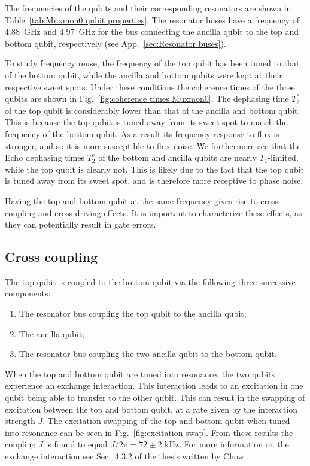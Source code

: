       The frequencies of the qubits and their corresponding resonators are shown in Table~\ref{tab:Muxmon0 qubit properties}. The resonator buses have a frequency of \SI{4.88}{\giga \hertz} and \SI{4.97}{\giga \hertz} for the bus connecting the ancilla qubit to the top and bottom qubit, respectively (see App.~\ref{sec:Resonator buses}).

      To study frequency reuse, the frequency of the top qubit has been tuned to that of the bottom qubit, while the ancilla and bottom qubits were kept at their respective sweet spots. Under these conditions the coherence times of the three qubits are shown in Fig.~\ref{fig:coherence times Muxmon0}. The dephasing time $T_2^*$ of the top qubit is considerably lower than that of the ancilla and bottom qubit. This is because the top qubit is tuned away from its sweet spot to match the frequency of the bottom qubit. As a result its frequency response to flux is stronger, and so it is more susceptible to flux noise. We furthermore see that the Echo dephasing times $T_2^\text{e}$ of the bottom and ancilla qubits are nearly $T_1$-limited, while the top qubit is clearly not. This is likely due to the fact that the top qubit is tuned away from its sweet spot, and is therefore more receptive to phase noise.

      Having the top and bottom qubit at the same frequency gives rise to cross-coupling and cross-driving effects. It is important to characterize these effects, as they can potentially result in gate errors.

    \subsection{Cross coupling}
      \label{ssec:cross coupling}

      The top qubit is coupled to the bottom qubit via the following three successive components:

      \begin{enumerate}
        \item The resonator bus coupling the top qubit to the ancilla qubit;
        \item The ancilla qubit;
        \item The resonator bus coupling the two ancilla qubit to the bottom qubit.
      \end{enumerate}

      When the top and bottom qubit are tuned into resonance, the two qubits experience an exchange interaction. This interaction leads to an excitation in one qubit being able to transfer to the other qubit. This can result in the swapping of excitation between the top and bottom qubit, at a rate given by the interaction strength $J$. The excitation swapping of the top and bottom qubit when tuned into resonance can be seen in Fig.~\ref{fig:excitation swap}. From these results the coupling $J$ is found to equal $J/2\pi=72 \pm 2$ kHz. For more information on the exchange interaction see Sec.~4.3.2 of the thesis written by Chow \cite{Chow}.

